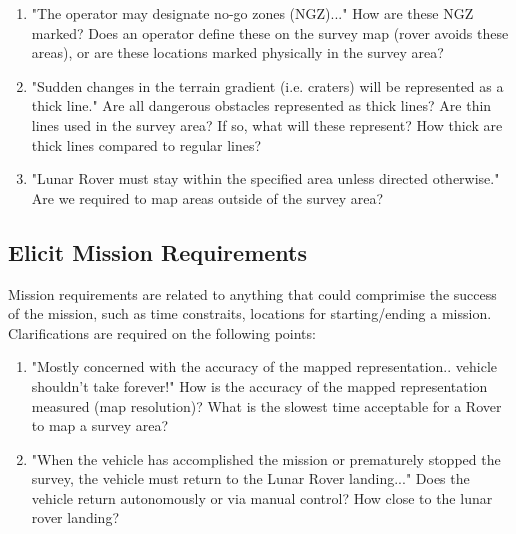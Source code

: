 \documentclass[11pt, a4paper]{article}
\begin{document}
\begin{flushleft}
\begin{enumerate}
  \item "The operator may designate no-go zones (NGZ)..."
  \linebreak How are these NGZ marked?
  \linebreak Does an operator define these on the survey map (rover avoids these areas), or are these locations marked physically in the survey area?
  
  \item "Sudden changes in the terrain gradient (i.e. craters) will be represented as a thick line."
  \linebreak Are all dangerous obstacles represented as thick lines?
  \linebreak Are thin lines used in the survey area? If so, what will these represent? How thick are thick lines compared to regular lines?
  
  \item "Lunar Rover must stay within the specified area unless directed otherwise."
  \linebreak Are we required to map areas outside of the survey area?
  
  \end{enumerate}
  
  
  \subsection{Elicit Mission Requirements}
  Mission requirements are related to anything that could comprimise the success of the mission, such as time constraits, locations for starting/ending a mission. Clarifications are required on the following points:
  
  \begin{enumerate}
  
  \item "Mostly concerned with the accuracy of the mapped representation.. vehicle shouldn't take forever!"
  \linebreak How is the accuracy of the mapped representation measured (map resolution)?
  \linebreak What is the slowest time acceptable for a Rover to map a survey area?
  
  \item "When the vehicle has accomplished the mission or prematurely stopped the survey, the vehicle must return to the Lunar Rover landing..."
  \linebreak Does the vehicle return autonomously or via manual control?
  \linebreak How close to the lunar rover landing?
  

\end{enumerate}
\end{flushleft}
\end{document}

